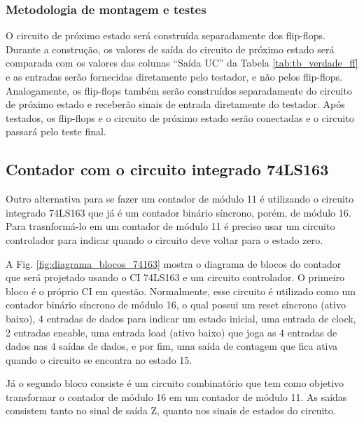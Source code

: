 \documentclass[a4,12pt]{horizon-theme}
\begin{document}
\subsubsection{Metodologia de montagem e testes}
\label{sec:plan_ff_montagem}

O circuito de próximo estado será construída separadamente dos flip-flops. Durante a construção, os valores de saída do circuito de próximo estado será comparada com os valores das colunas ``Saída UC'' da Tabela \ref{tab:tb_verdade_ff} e as entradas serão fornecidas diretamente pelo testador, e não pelos flip-flops. Analogamente, os flip-flops também serão construídos separadamente do circuito de próximo estado e receberão sinais de entrada diretamente do testador. Após testados, os flip-flops e o circuito de próximo estado serão conectadas e o circuito passará pelo teste final.



\subsection{Contador com o circuito integrado 74LS163}
\label{sec:plan_74163}

Outro alternativa para se fazer um contador de módulo 11 é utilizando o circuito integrado 74LS163 que já é um contador binário síncrono, porém, de módulo 16. Para trasnformá-lo em um contador de módulo 11 é preciso usar um circuito controlador para indicar quando o circuito deve voltar para o estado zero.

A Fig. \ref{fig:diagrama_blocos_74163} mostra o diagrama de blocos do contador que será projetado usando o CI 74LS163 e um circuito controlador. O primeiro bloco é o próprio CI em questão. Normalmente, esse circuito é utilizado como um contador binário síncrono de módulo 16, o qual possui um reset síncrono (ativo baixo), 4 entradas de dados para indicar um estado inicial, uma entrada de clock, 2 entradas eneable, uma entrada load (ativo baixo) que joga as 4 entradas de dados nas 4 saídas de dados, e por fim, uma saída de contagem que fica ativa quando o circuito se encontra no estado 15.

Já o segundo bloco consiste é um circuito combinatório que tem como objetivo transformar o contador de módulo 16 em um contador de módulo 11. As saídas consistem tanto no sinal de saída Z, quanto nos sinais de estados do circuito.
\end{document}
